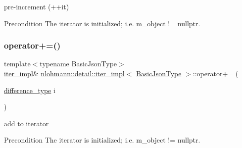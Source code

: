 pre-\/increment (++it) 

\begin{DoxyPrecond}{Precondition}
The iterator is initialized; i.\+e. {\ttfamily m\+\_\+object != nullptr}. 
\end{DoxyPrecond}
\mbox{\label{classnlohmann_1_1detail_1_1iter__impl_a3eef94f9d167046e7f773aeb6b78090c}} 
\subsubsection{\texorpdfstring{operator+=()}{operator+=()}}
{\footnotesize\ttfamily template$<$typename Basic\+Json\+Type$>$ \\
\hyperlink{classnlohmann_1_1detail_1_1iter__impl}{iter\+\_\+impl}\& \hyperlink{classnlohmann_1_1detail_1_1iter__impl}{nlohmann\+::detail\+::iter\+\_\+impl}$<$ \hyperlink{classnlohmann_1_1detail_1_1iter__impl_abf18f18793f84b0222aebb5a2a87da7a}{Basic\+Json\+Type} $>$\+::operator+= (\begin{DoxyParamCaption}\item[{\hyperlink{classnlohmann_1_1detail_1_1iter__impl_a2f7ea9f7022850809c60fc3263775840}{difference\+\_\+type}}]{i }\end{DoxyParamCaption})\hspace{0.3cm}{\ttfamily [inline]}}



add to iterator 

\begin{DoxyPrecond}{Precondition}
The iterator is initialized; i.\+e. {\ttfamily m\+\_\+object != nullptr}. 
\end{DoxyPrecond}
\mbox{\label{classnlohmann_1_1detail_1_1iter__impl_a0dd9c415b94a02ff2aa25da75e52da30}} 
